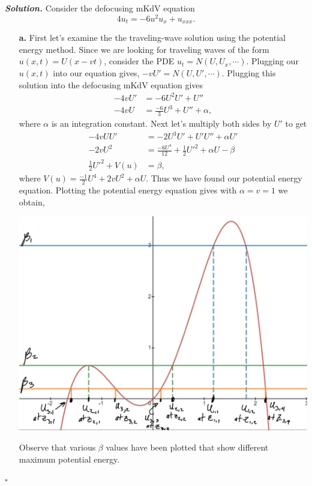 \documentclass[12pt]{report}
\newenvironment{solution}[1][\it{Solution}]{\textbf{#1. } }{$\square$}
\begin{document}
\begin{solution}
    \noindent
    Consider the defocusing mKdV equation
    \[
        4u_t=-6u^2 u_x+u_{xxx}.
    \]
    \begin{enumerate}
        \item[{\bf a.}]
        First let's examine the the traveling-wave solution using the potential energy method. Since we are looking for traveling waves of the form $u(x,t) = U
        (x-vt)$, consider the PDE $u_t = N(U,U_x,\cdots)$. Plugging our $u(x,t)$ into our equation gives, $-vU' = N(U,U',\cdots)$. Plugging this solution into the defocusing mKdV equation gives 
        \begin{align*}
            -4vU' &= - 6U^2U' + U''\\
            -4vU &= \frac{-6}{3}U^3 + U'' + \alpha,
        \end{align*}
        where $\alpha$ is an integration constant. Next let's multiply both sides by $U'$ to get
        \begin{align*}
            -4vUU' &= -2U^3U' + U'U'' + \alpha U'\\
            -2vU^2 &= \frac{-6U^4}{12} + \frac{1}{2}U'^2 + \alpha U - \beta\\
            \frac{1}{2}U'^2 + V(u) &= \beta,
        \end{align*}
        where $V(u) = \frac{-1}{2}U^4 + 2vU^2 + \alpha U$. Thus we have found our potential energy equation. Plotting the potential energy equation gives with $\alpha = v = 1$ we obtain,
        \begin{center}
            \includegraphics[width=.6\textwidth]{plots/4b-1.jpg}
        \end{center}
        Observe that various $\beta$ values have been plotted that show different maximum potential energy. 
        

\end{enumerate}
\end{solution}
\end{document}
